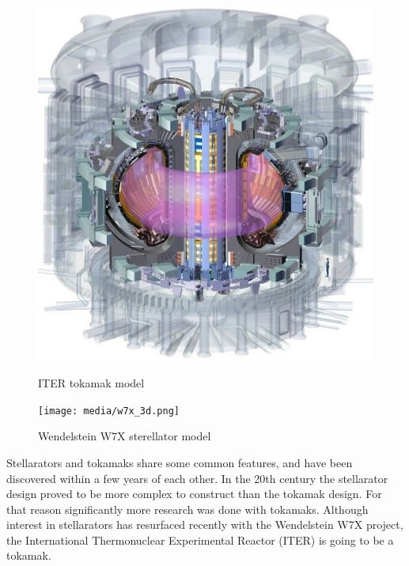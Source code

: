   \begin{figure}[H]
    \centering
    \begin{minipage}{.5\textwidth}
      \centering
      \includegraphics[width=\linewidth]{media/iter_reactor_3d.jpeg}
      \caption{ITER tokamak model\cite{iter_website}}
      \label{fig:iter_reactor}
    \end{minipage}%
    \begin{minipage}{.5\textwidth}
      \centering
	  \texttt{[image: media/w7x\_3d.png]}
      \caption{Wendelstein W7X sterellator model\cite{w7x_website}}
      \label{fig:w7x_reactor}
    \end{minipage}
  \end{figure}

  Stellarators and tokamaks share some common features,
  and have been discovered within a few years of each other.
  In the 20th century the stellarator design proved 
  to be more complex to construct than the tokamak design.
  For that reason significantly more research was done with tokamaks.
  Although interest in stellarators has resurfaced recently with
  the Wendelstein W7X project,
  the International Thermonuclear Experimental Reactor (ITER)
  is going to be a tokamak.
  \cite{nuclear_fusion_status}

